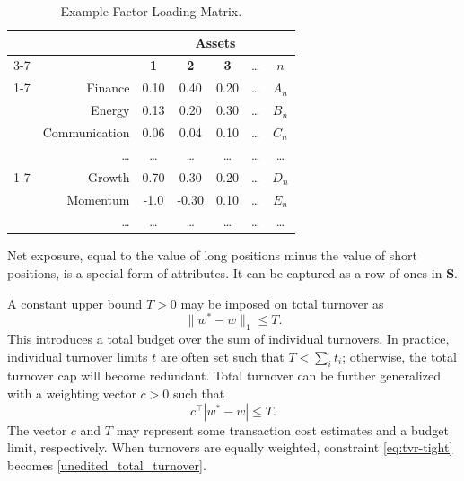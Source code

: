 \documentclass[11pt, letterpaper]{article}
\begin{document}
\begin{table}[t]
\centering
\caption{Example Factor Loading Matrix.}
\label{example_attribute_matrix}
    \vspace{0.3cm}
    \begin{tabular}{cr *{5}{c}}
        \toprule
        & & \multicolumn{5}{c}{\textbf{Assets}} \\
        \cmidrule(lr){3-7}
        & & \textbf{1} & \textbf{2} & \textbf{3} & \dots & \textbf{$n$} \\
        \cmidrule(lr){1-7}
        & Finance & 0.10 & 0.40 & 0.20 & \dots & $A_n$ \\
        & Energy & 0.13 & 0.20 & 0.30 & \dots & $B_n$ \\
        & Communication & 0.06 & 0.04 & 0.10 & \dots & $C_n$ \\
        & \dots & \dots & \dots & \dots & \dots & \dots \\
        \cmidrule(lr){1-7}
        & Growth & 0.70 & 0.30 & 0.20 & \dots & $D_n$ \\
        & Momentum & -1.0 & -0.30 & 0.10 & \dots & $E_n$ \\
        & \dots & \dots & \dots & \dots & \dots & \dots \\
        \bottomrule
    \end{tabular}
\end{table}

Net exposure, equal to the value of long positions minus the value of short positions, is a special form of attributes. It can
be captured as a row of ones in $\mathbf{S}$.

A constant upper bound $T > 0$ may be imposed on total turnover as
\begin{equation}
    \label{unedited_total_turnover}
	\lVert w^* - w\rVert_1 \leq T.
\end{equation}
This introduces a total budget over the sum of individual turnovers. In practice, individual turnover limits $t$ are often set
such that $T < \sum_i t_i$; otherwise, the total turnover cap will become redundant. Total turnover can be further
generalized with a weighting vector $c > 0$ such that
\begin{equation}\label{eq:tvr-tight}
	c^\top |w^* - w| \leq T.
\end{equation}
The vector $c$ and $T$ may represent some transaction cost estimates and a budget limit, respectively. When turnovers are
equally weighted, constraint \eqref{eq:tvr-tight} becomes \eqref{unedited_total_turnover}.
\end{document}

